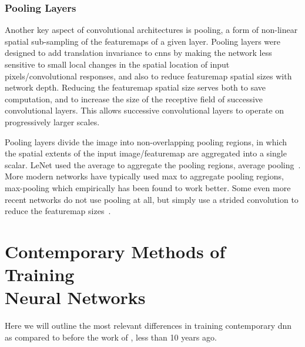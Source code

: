 \documentclass[thesis]{subfiles}
\begin{document}
\subsubsection{Pooling Layers}
Another key aspect of convolutional architectures is pooling, a form of non-linear spatial sub-sampling of the \glspl{featuremap} of a given layer. Pooling layers were designed to add translation invariance to \glspl{cnn} by making the network less sensitive to small local changes in the spatial location of input pixels/convolutional responses, and also to reduce \gls{featuremap} spatial sizes with network depth. Reducing the \gls{featuremap} spatial size serves both to save computation, and to increase the size of the receptive field of successive convolutional layers. This allows successive convolutional layers to operate on progressively larger scales.

Pooling layers divide the image into non-overlapping pooling regions, in which the spatial extents of the input image/\gls{featuremap} are aggregated into a single scalar. LeNet used the average to aggregate the pooling regions, \ie average pooling~\citep{Lecun1998}. More modern networks have typically used max to aggregate pooling regions, \ie max-pooling which empirically has been found to work better. Some even more recent networks do not use pooling at all, but simply use a strided convolution to reduce the \gls{featuremap} sizes~\citep{He2015}.

\section[Contemporary Methods of Training Neural Networks]{Contemporary Methods of Training\\Neural Networks}
\label{section:contemporary}
Here we will outline the most relevant differences in training contemporary \gls{dnn} as compared to before the work of \citet{Krizhevsky2012}, less than 10 years ago.
\end{document}
